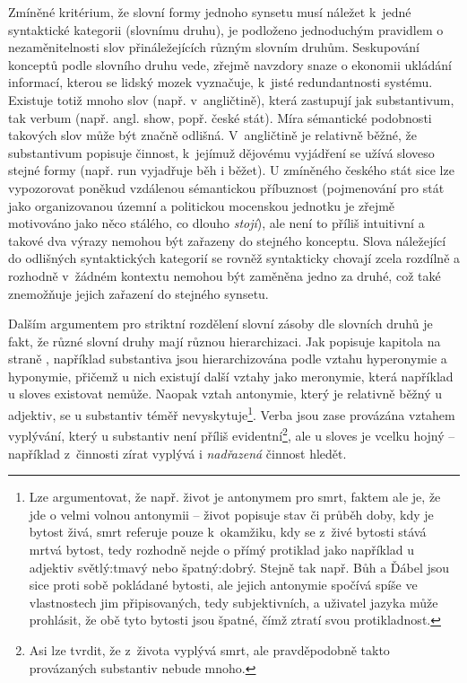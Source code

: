 \documentclass[a4paper,11pt,openany,twoside]{book}
\newcommand{\itNameRef}[1]{\textit{\nameref{#1}}}
\newcommand\ex{\textsf}
\begin{document}
					Zmíněné kritérium, že slovní formy jednoho synsetu musí náležet k~jedné syntaktické kategorii (slovnímu druhu), je podloženo jednoduchým pravidlem o nezaměnitelnosti slov přináležejících různým slovním druhům. %
					Seskupování konceptů podle slovního druhu vede, zřejmě navzdory snaze o ekonomii ukládání informací, kterou se lidský mozek vyznačuje, k~jisté redundantnosti systému. Existuje totiž mnoho slov (např. v~angličtině), která zastupují jak substantivum, tak verbum (např. angl. \ex{show}, popř. české \ex{stát}). Míra sémantické podobnosti takových slov může být značně odlišná. V~angličtině je relativně běžné, že substantivum popisuje činnost, k~jejímuž dějovému vyjádření se užívá sloveso stejné formy (např. \ex{run} vyjadřuje \ex{běh} i \ex{běžet}). U zmíněného českého \ex{stát} sice lze vypozorovat poněkud vzdálenou sémantickou příbuznost (pojmenování pro stát jako organizovanou územní a politickou mocenskou jednotku \parencite{Dorling2003oxforddic} je zřejmě motivováno jako něco stálého, co dlouho \textit{stojí}), ale není to příliš intuitivní a takové dva výrazy nemohou být zařazeny do stejného konceptu. Slova náležející do odlišných syntaktických kategorií se rovněž syntakticky chovají zcela rozdílně a rozhodně v~žádném kontextu nemohou být zaměněna jedno za druhé, což také znemožňuje jejich zařazení do stejného synsetu. \parencite{miller1990introduction} 

					Dalším argumentem pro striktní rozdělení slovní zásoby dle slovních druhů je fakt, že různé slovní druhy mají různou hierarchizaci. Jak popisuje kapitola \itNameRef{cha:sem-vztahy} na straně \pageref{cha:sem-vztahy}, například substantiva jsou hierarchizována podle vztahu hyperonymie a hyponymie, přičemž u nich existují další vztahy jako meronymie, která například u sloves existovat nemůže. Naopak vztah antonymie, který je relativně běžný u adjektiv, se u substantiv téměř nevyskytuje\footnote{Lze argumentovat, že např. \ex{život} je antonymem pro \ex{smrt}, faktem ale je, že jde o velmi volnou antonymii -- život popisuje stav či průběh doby, kdy je bytost živá, smrt referuje pouze k~okamžiku, kdy se z~živé bytosti stává mrtvá bytost, tedy rozhodně nejde o přímý protiklad jako například u adjektiv \ex{světlý:tmavý} nebo \ex{špatný:dobrý}. Stejně tak např. \ex{Bůh} a \ex{Ďábel} jsou sice proti sobě pokládané bytosti, ale jejich antonymie spočívá spíše ve vlastnostech jim připisovaných, tedy subjektivních, a uživatel jazyka může prohlásit, že obě tyto bytosti jsou špatné, čímž ztratí svou protikladnost.}. Verba jsou zase provázána vztahem vyplývání, který u substantiv není příliš evidentní\footnote{Asi lze tvrdit, že z~\ex{života} vyplývá \ex{smrt}, ale pravděpodobně takto provázaných substantiv nebude mnoho.}, ale u sloves je vcelku hojný -- například z~činnosti \ex{zírat} vyplývá i \textit{nadřazená} činnost \ex{hledět}.
\end{document}
